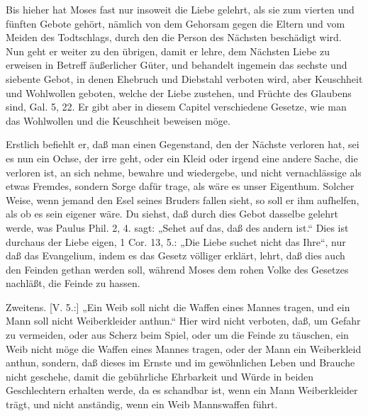 Bis hieher hat Moses fast nur insoweit die Liebe gelehrt, als sie zum vierten und fünften Gebote gehört, nämlich von dem Gehorsam gegen die Eltern und vom Meiden des Todtschlags, durch den die Person des Nächsten beschädigt wird. Nun geht er weiter zu den übrigen, damit er lehre, dem Nächsten Liebe zu erweisen in Betreff äußerlicher Güter, und behandelt ingemein das sechste und siebente Gebot, in denen Ehebruch und Diebstahl verboten wird, aber Keuschheit und Wohlwollen geboten, welche der Liebe zustehen, und Früchte des Glaubens sind, Gal. 5, 22. Er gibt aber in diesem Capitel verschiedene Gesetze, wie man das Wohlwollen und die Keuschheit beweisen möge.

Erstlich befiehlt er, daß man einen Gegenstand, den der Nächste verloren hat, sei es nun ein Ochse, der irre geht, oder ein Kleid oder irgend eine andere Sache, die verloren ist, an sich nehme, bewahre und wiedergebe, und nicht vernachlässige als etwas Fremdes, sondern Sorge dafür trage, als wäre es unser Eigenthum. Solcher Weise, wenn jemand den Esel seines Bruders fallen sieht, so soll er ihm aufhelfen, als ob es sein eigener wäre. Du siehst, daß durch dies Gebot dasselbe gelehrt werde, was Paulus Phil. 2, 4. sagt: „Sehet auf das, daß des andern ist.“ Dies ist durchaus der Liebe eigen, 1 Cor. 13, 5.: „Die Liebe suchet nicht das Ihre“, nur daß das Evangelium, indem es das Gesetz völliger erklärt, lehrt, daß dies auch den Feinden gethan werden soll, während Moses dem rohen Volke des Gesetzes nachläßt, die Feinde zu hassen.

Zweitens. [V. 5.:] „Ein Weib soll nicht die Waffen eines Mannes tragen, und ein Mann soll nicht Weiberkleider anthun.“ Hier wird nicht verboten, daß, um Gefahr zu vermeiden, oder aus Scherz beim Spiel, oder um die Feinde zu täuschen, ein Weib nicht möge die Waffen eines Mannes tragen, oder der Mann ein Weiberkleid anthun, sondern, daß dieses im Ernste und im gewöhnlichen Leben und Brauche nicht geschehe, damit die gebührliche Ehrbarkeit und Würde in beiden Geschlechtern erhalten werde, da es schandbar ist, wenn ein Mann Weiberkleider trägt, und nicht anständig, wenn ein Weib Mannswaffen führt.

